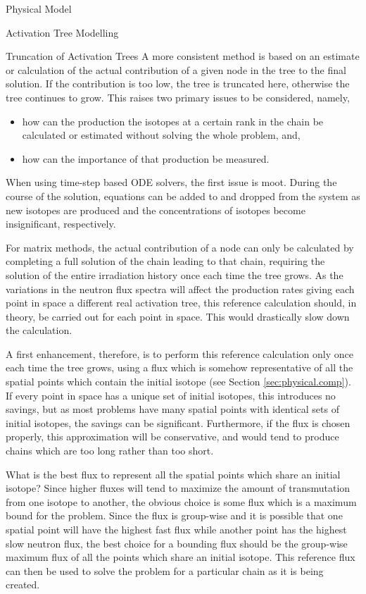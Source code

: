 \begin{chapter}{Physical Model\label{chap:physical}}
\begin{section}{Activation Tree Modelling\label{sec:physical.chains}}
\begin{subsection}{Truncation of Activation Trees}
    A more consistent method is based on an estimate or calculation of
    the actual contribution of a given node in the tree to the final
    solution.  If the contribution is too low, the tree is truncated
    here, otherwise the tree continues to grow.  This raises two
    primary issues to be considered, namely,
    \begin{itemize}
    \item how can the production the isotopes at a certain rank in the
      chain be calculated or estimated without solving the whole
      problem, and,
    \item how can the importance of that production be measured.
    \end{itemize}
    
    When using time-step based ODE solvers, the first issue is moot.
    During the course of the solution, equations can be added to and
    dropped from the system as new isotopes are produced and the
    concentrations of isotopes become insignificant, respectively.
    
    For matrix methods, the actual contribution of a node can only be
    calculated by completing a full solution of the chain leading to
    that chain, requiring the solution of the entire irradiation
    history once each time the tree grows.  As the variations in the
    neutron flux spectra will affect the production rates giving each
    point in space a different real activation tree, this reference
    calculation should, in theory, be carried out for each point in
    space.  This would drastically slow down the calculation.
    
    A first enhancement, therefore, is to perform this reference
    calculation only once each time the tree grows, using a flux which
    is somehow representative of all the spatial points which contain
    the initial isotope (see Section \ref{sec:physical.comp}). If
    every point in space has a unique set of initial isotopes, this
    introduces no savings, but as most problems have many spatial
    points with identical sets of initial isotopes, the savings can be
    significant.  Furthermore, if the flux is chosen properly, this
    approximation will be conservative, and would tend to produce
    chains which are too long rather than too short.
    
    What is the best flux to represent all the spatial points which
    share an initial isotope?  Since higher fluxes will tend to
    maximize the amount of transmutation from one isotope to another,
    the obvious choice is some flux which is a maximum bound for the
    problem.  Since the flux is group-wise and it is possible that one
    spatial point will have the highest fast flux while another point
    has the highest slow neutron flux, the best choice for a bounding
    flux should be the group-wise maximum flux of all the points which
    share an initial isotope.  This reference flux can then be used to
    solve the problem for a particular chain as it is being created.
    

\end{subsection}
\end{section}
\end{chapter}
